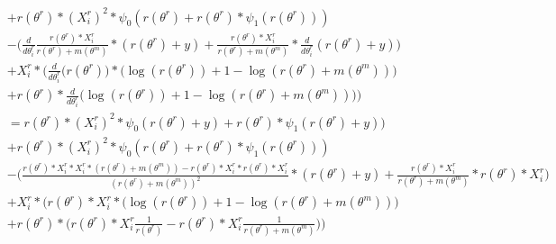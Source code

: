\documentclass[bibliography=totoc,10pt]{scrartcl}
\begin{document}
\begin{equation}
\begin{split}
&+ r(\theta^r) * (X^r_{i})^2 * \psi_0(r(\theta^r) +  r(\theta^r) *  \psi_1(r(\theta^r)) ) \\
&- \bigg(  \frac{d}{d \theta^r_i} \frac{r(\theta^r) * X^r_{i} }{r(\theta^r)+m(\theta^m)} *(r(\theta^r) + y) + \frac{r(\theta^r) * X^r_{i} }{r(\theta^r)+m(\theta^m)} *\frac{d}{d \theta^r_i}  (r(\theta^r) + y) \bigg) \\
&+ X^r_{i} * \bigg(  \frac{d}{d \theta^r_i}  \bigg( r(\theta^r) \bigg) * \bigg( \log(r(\theta^r)) + 1 - \log(r(\theta^r)+m(\theta^m)) \bigg) \\
&+ r(\theta^r) * \frac{d}{d \theta^r_i} \bigg( \log(r(\theta^r)) + 1 - \log(r(\theta^r)+m(\theta^m)) \bigg)  \bigg) \\
&= r(\theta^r) * (X^r_{i})^2 * \psi_0(r(\theta^r)+y) +  r(\theta^r) *  \psi_1(r(\theta^r)+y) ) \\
&+ r(\theta^r) * (X^r_{i})^2 * \psi_0(r(\theta^r) +  r(\theta^r) *  \psi_1(r(\theta^r)) ) \\
&- \bigg( \frac{r(\theta^r) * X^r_{i} * X^r_{i} *(r(\theta^r)+m(\theta^m)) - r(\theta^r) * X^r_{i}*r(\theta^r) * X^r_{i}}{(r(\theta^r)+m(\theta^m))^2} *(r(\theta^r) + y) + \frac{r(\theta^r) * X^r_{i} }{r(\theta^r)+m(\theta^m)} *r(\theta^r) * X^r_{i} \bigg) \\
&+ X^r_{i} * \bigg(  r(\theta^r) * X^r_{i} * \bigg( \log(r(\theta^r)) + 1 - \log(r(\theta^r)+m(\theta^m)) \bigg) \\
&+ r(\theta^r) * \bigg( r(\theta^r) * X^r_{i} \frac{1}{r(\theta^r)} - r(\theta^r) * X^r_{i} \frac{1}{r(\theta^r)+m(\theta^m)} \bigg)  \bigg) \\
\end{split}
\end{equation}
\end{document}

